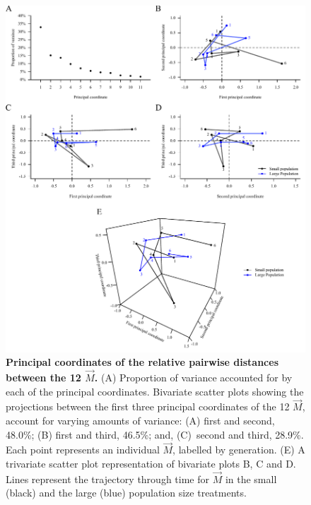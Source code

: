 \begin{figure}[htp]
\includegraphics[width=1\textwidth]{Chp3_Multi/M_in_H_MittDist_3D.pdf}
\vspace*{-0.4cm}
\caption[Principal coordinates of the relative pairwise distances between the 12 $\vec{M}$.]{\textbf{Principal coordinates of the relative pairwise distances between the 12 $\vec{M}$.} (A) Proportion of variance accounted for by each of the principal coordinates. Bivariate scatter plots showing the projections between the first three principal coordinates of the 12 $\vec{M}$, account for varying amounts of variance: (A) first and second, 48.0\%; (B) first and third, 46.5\%; and, (C)~second and third, 28.9\%. Each point represents an individual $\vec{M}$, labelled by generation. (E) A trivariate scatter plot representation of bivariate plots B, C and D. Lines represent the trajectory through time for $\vec{M}$ in the small (black) and the large (blue) population size treatments.}
\label{fig:multi_Mitteroecker}
\end{figure}
\FloatBarrier

 

